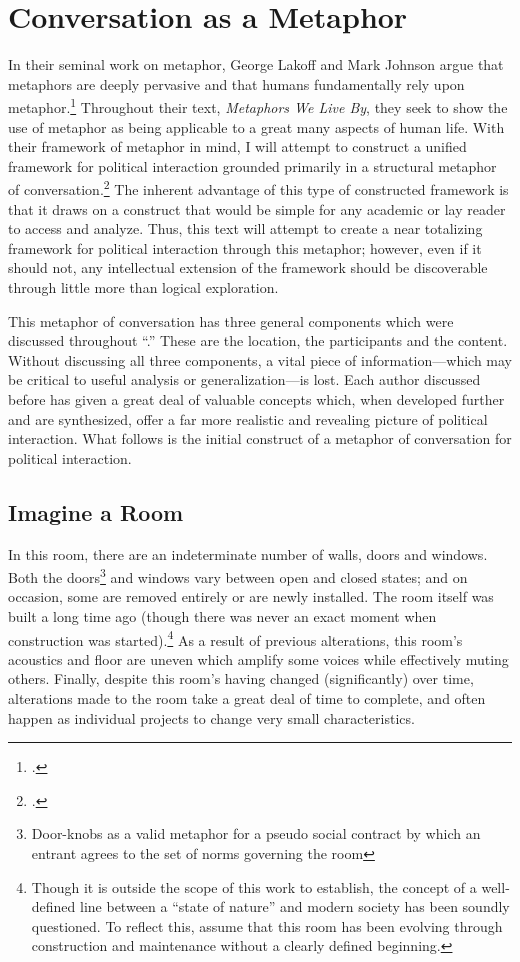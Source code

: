 \documentclass{article}
\begin{document}
\section{Conversation as a Metaphor}
In their seminal work on metaphor, George Lakoff and Mark Johnson argue that metaphors are deeply pervasive and that humans fundamentally rely upon metaphor.\footcite[3--6]{lakoffjohnson80}
Throughout their text, \emph{Metaphors We Live By}, they seek to show the use of metaphor as being applicable to a great many aspects of human life.
With their framework of metaphor in mind, I will attempt to construct a unified framework for political interaction grounded primarily in a structural metaphor of conversation.\footcite[14]{lakoffjohnson80} 
The inherent advantage of this type of constructed framework is that it draws on a construct that would be simple for any academic or lay reader to access and analyze.
Thus, this text will attempt to create a near totalizing framework for political interaction through this metaphor; however, even if it should not, any intellectual extension of the framework should be discoverable through little more than logical exploration.

This metaphor of conversation has three general components which were discussed throughout ``.'' 
These are the location, the participants and the content.
Without discussing all three components, a vital piece of information---which may be critical to useful analysis or generalization---is lost.
Each author discussed before has given a great deal of valuable concepts which, when developed further and are synthesized, offer a far more realistic and revealing picture of political interaction.
What follows is the initial construct of a metaphor of conversation for political interaction.

\subsection{Imagine a Room}
In this room, there are an indeterminate number of walls, doors and windows.
Both the doors\footnote{Door-knobs as a valid metaphor for a pseudo social contract by which an entrant agrees to the set of norms governing the room} and windows vary between open and closed states; and on occasion, some are removed entirely or are newly installed.
The room itself was built a long time ago (though there was never an exact moment when construction was started).\footnote{Though it is outside the scope of this work to establish, the concept of a well-defined line between a ``state of nature'' and modern society has been soundly questioned. To reflect this, assume that this room has been evolving through construction and maintenance without a clearly defined beginning.}
As a result of previous alterations, this room's acoustics and floor are uneven which amplify some voices while effectively muting others. 
Finally, despite this room's having changed (significantly) over time, alterations made to the room take a great deal of time to complete, and often happen as individual projects to change very small characteristics.
\end{document}
